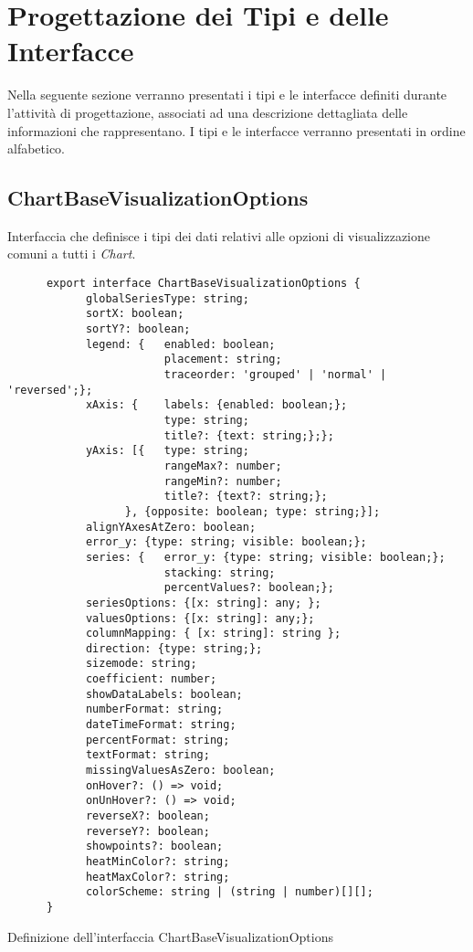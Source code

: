 \section{Progettazione dei Tipi e delle Interfacce}
Nella seguente sezione verranno presentati i tipi e le interfacce definiti durante l'attività di progettazione, associati ad una descrizione dettagliata
delle informazioni che rappresentano. \newline
I tipi e le interfacce verranno presentati in ordine alfabetico.
\subsection{ChartBaseVisualizationOptions}
Interfaccia che definisce i tipi dei dati relativi alle opzioni di visualizzazione comuni a tutti i \textit{Chart}.
\begin{listing}[htdp]
      \begin{verbatim}
      export interface ChartBaseVisualizationOptions {
            globalSeriesType: string; 
            sortX: boolean;
            sortY?: boolean;
            legend: {   enabled: boolean;
                        placement: string;
                        traceorder: 'grouped' | 'normal' | 'reversed';};
            xAxis: {    labels: {enabled: boolean;};
                        type: string;
                        title?: {text: string;};};
            yAxis: [{   type: string;
                        rangeMax?: number;
                        rangeMin?: number;
                        title?: {text?: string;};
                  }, {opposite: boolean; type: string;}];
            alignYAxesAtZero: boolean;
            error_y: {type: string; visible: boolean;};
            series: {   error_y: {type: string; visible: boolean;};
                        stacking: string;
                        percentValues?: boolean;};
            seriesOptions: {[x: string]: any; };
            valuesOptions: {[x: string]: any;};
            columnMapping: { [x: string]: string };
            direction: {type: string;};
            sizemode: string;
            coefficient: number;
            showDataLabels: boolean;
            numberFormat: string;
            dateTimeFormat: string;
            percentFormat: string;
            textFormat: string;
            missingValuesAsZero: boolean;
            onHover?: () => void;
            onUnHover?: () => void;
            reverseX?: boolean;
            reverseY?: boolean;
            showpoints?: boolean;
            heatMinColor?: string;
            heatMaxColor?: string;
            colorScheme: string | (string | number)[][];
      }
      \end{verbatim}
      \caption{Definizione dell'interfaccia ChartBaseVisualizationOptions}
      \label{listing:chartBaseVisualizationOptions}
\end{listing}
